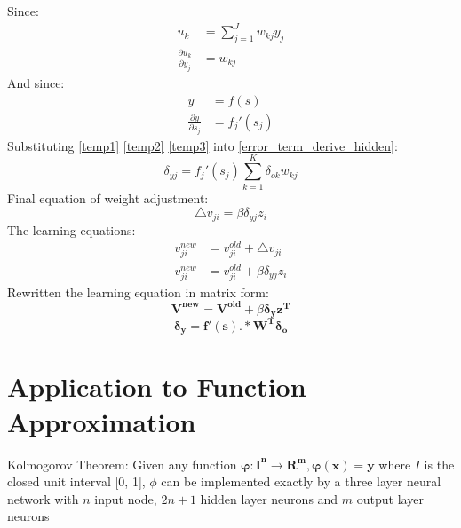 Since:
\begin{equation}
\begin{split}
u_k &= \sum_{j=1}^{J} w_{kj} y_j \\
\frac{\partial u_k}{\partial y_j} &= w_{kj}
\end{split}
\label{temp2}
\end{equation}
And since:
\begin{equation}
\begin{split}
y &= f(s) \\
\frac{\partial y}{\partial s_j} &= f_{j}'(s_j)
\end{split}
\label{temp3}
\end{equation}
Substituting \ref{temp1} \ref{temp2} \ref{temp3} into \ref{error_term_derive_hidden}:
$$\delta_{yj} = f_j'(s_j)\sum_{k=1}^{K} \delta_{ok} w_{kj}$$
Final equation of weight adjustment:
$$\triangle v_{ji} = \beta \delta_{yj} z_i$$
The learning equations:
\begin{equation*}
\begin{split}
v_{ji}^{new} &= v_{ji}^{old} + \triangle v_{ji} \\
v_{ji}^{new} &= v_{ji}^{old} + \beta \delta_{yj} z_i
\end{split}
\end{equation*}
Rewritten the learning equation in matrix form:
$$\mathbf{V^{new} = V^{old}} + \beta \mathbf{\delta_y z^{T}}$$
$$\mathbf{\delta_y = f'(s) .* W^{T} \delta_o}$$

\section{Application to Function Approximation}
Kolmogorov Theorem: Given any function $\mathbf{\varphi: I^{n} \rightarrow R^{m}, \varphi(x) = y}$ where $I$ is the closed unit interval [0, 1], $\phi$ can be implemented exactly by a three layer neural network with $n$ input node, $2n+1$ hidden layer neurons and $m$ output layer neurons
